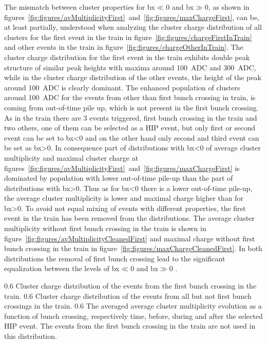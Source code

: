 The mismatch between cluster properties for bx$\ll$0 and bx$\gg$0, as shown in figures~\ref{fig:figures/avMultiplicityFirst}~and~\ref{fig:figures/maxChargeFirst}, can be, at least partially, understood when analyzing the cluster charge distribution of all clusters for the first event in the train in figure~\ref{fig:figures/chargeFirstInTrain} and other events in the train in figure~\ref{fig:figures/chargeOtherInTrain}. The cluster charge distribution for the first event in the train exhibits double peak structure of similar peak heights with maxima around 100~ADC and 300~ADC, while in the cluster charge distribution of the other events, the height of the peak around 100~ADC is clearly dominant. The enhanced population of clusters around 100~ADC for the events from other than first bunch crossing in train, is coming from out-of-time pile up, which is not present in the first bunch crossing. As in the train there are 3 events triggered, first bunch crossing in the train and two others, one of them can be selected as a HIP event, but only first or second event can be set to bx<0 and on the other hand only second and third event can be set as bx>0. In consequence part of distributions with bx<0 of average cluster multiplicity and maximal cluster charge at figures~\ref{fig:figures/avMultiplicityFirst}~and~\ref{fig:figures/maxChargeFirst} is dominated by population with lower out-of-time pile-up than the part of distributions with bx>0. Thus as for bx<0 there is a lower out-of-time pile-up, the average cluster multiplicity is lower and maximal charge higher than for bx>0. To avoid not equal mixing of events with different properties, the first event in the train has been removed from the distributions. The average cluster multiplicity without first bunch crossing in the train is shown in figure~\ref{fig:figures/avMultiplicityCleanedFirst} and maximal charge without first bunch crossing in the train in figure~\ref{fig:figures/maxChargeCleanedFirst}. In both distributions the removal of first bunch crossing lead to the significant equalization between the levels of bx$\ll$0 and bx$\gg$0 .

                 {0.6}       %
                 {Cluster charge distribution of the events from the first bunch crossing in the train. } %
                 {0.6}       %
                 {Cluster charge distribution of the events from all but not first bunch crossings in the train. } %
                 {0.6}       %
                 {The averaged average cluster multiplicity evolution as a function of bunch crossing, respectively time, before, during and after the selected HIP event. The events from the first bunch crossing in the train are not used in this distribution. } %

